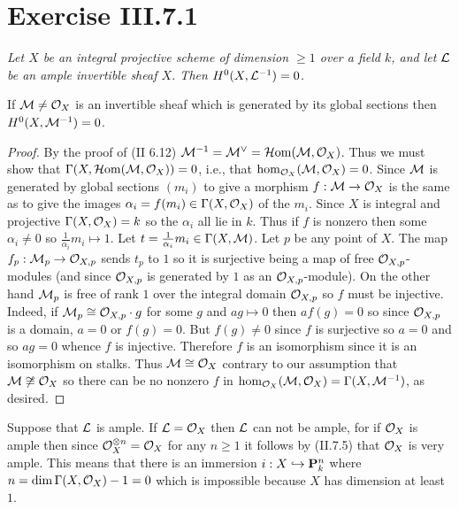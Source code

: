 \documentclass[12pt]{article}
\begin{document}
\section{Exercise III.7.1}
{\em Let $X$ be an integral projective
scheme of dimension $\geq 1$ over a field $k$, and let 
$\sL$ be an ample invertible sheaf $X$. Then $H^0(X,\sL^{-1})=0$.}

\begin{lem} If $\M\neq\sox$ is an invertible sheaf which is generated by
its global sections then $H^0(X,\M^{-1})=0$. \end{lem}
\begin{proof}
By the proof of (II 6.12) $\M^{-1}=\M^{\dual}=\shom(\M,\sox)$. 
Thus we must show that $\Gamma(X,\shom(\M,\sox))=0$, i.e., that
$\hom_{\sox}(\M,\sox)=0$. Since $\M$ is generated by global
sections $(m_i)$ to give a morphism $f:\M\into\sox$ is the same
as to give the images $\alpha_i=f(m_i)\in\Gamma(X,\sox)$ of the
$m_i$. Since $X$ is integral and projective $\Gamma(X,\sox)=k$
so the $\alpha_i$ all lie in $k$. Thus if $f$
is nonzero then some $\alpha_i\neq 0$ so $\frac{1}{\alpha_i}m_i\mapsto 1$.
Let $t=\frac{1}{\alpha_i}m_i\in\Gamma(X,\M)$. Let $p$ be any
point of $X$. The map $f_p:\M_p\into\soxp$ sends $t_p$ to
$1$ so it is surjective being a map of free $\soxp$-modules (and
since $\soxp$ is generated by $1$ as an $\soxp$-module). On the
other hand $\M_p$ is free of rank $1$ over the integral domain
$\soxp$ so $f$ must be injective. Indeed, if $\M_p\isom\soxp\cdot g$
for some $g$ and $ag\mapsto 0$ then $af(g)=0$ so since $\soxp$ is a domain,
$a=0$ or $f(g)=0$. But $f(g)\neq 0$ since $f$ is surjective so $a=0$ 
and so $ag=0$ whence $f$ is injective. Therefore $f$ is an isomorphism
since it is an isomorphism on stalks. Thus $\M\isom\sox$ contrary
to our assumption that $\M\not\isom\sox$ so there
can be no nonzero $f$ in $\hom_{\sox}(\M,\sox)=\Gamma(X,\M^{-1})$,
as desired.
\end{proof}

Suppose that $\L$ is ample. If $\L=\sox$ then $\L$ can not be ample,
for if $\sox$ is ample then since $\sox^{\tensor n}=\sox$ for any $n\geq 1$
it follows by (II.7.5) that $\sox$ is very ample. This means that there
is an immersion $i:X\hookrightarrow\P_k^n$ where $n=\dim\Gamma(X,\sox)-1=0$
which is impossible because $X$ has dimension at least $1$. 
\end{document}
